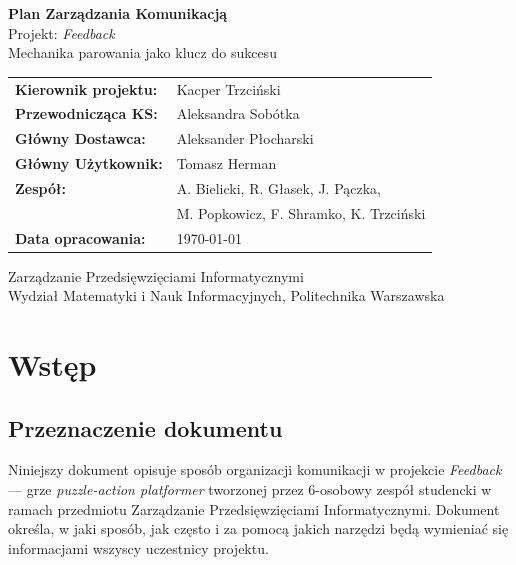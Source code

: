 \documentclass[11pt,a4paper]{article}
\begin{document}
\begin{titlepage}
\centering
\vspace*{2cm}
{\LARGE\bfseries\color{accent} Plan Zarządzania Komunikacją}\\[0.5cm]
{\large Projekt: \textit{Feedback}}\\[0.3cm]
{\normalsize Mechanika parowania jako klucz do sukcesu}\\[2cm]

\begin{tabular}{ll}
\textbf{Kierownik projektu:}   & Kacper Trzciński \\[0.3em]
\textbf{Przewodnicząca KS:}    & Aleksandra Sobótka \\[0.3em]
\textbf{Główny Dostawca:}      & Aleksander Płocharski \\[0.3em]
\textbf{Główny Użytkownik:}    & Tomasz Herman \\[0.3em]
\textbf{Zespół:}               & A. Bielicki, R. Głasek, J. Pączka, \\
                               & M. Popkowicz, F. Shramko, K. Trzciński \\[0.3em]
\textbf{Data opracowania:}     & \today \\[0.3em]
\end{tabular}

\vfill
{\small Zarządzanie Przedsięwzięciami Informatycznymi\\
Wydział Matematyki i Nauk Informacyjnych, Politechnika Warszawska}
\end{titlepage}

\tableofcontents
\newpage

\section{Wstęp}

\subsection{Przeznaczenie dokumentu}
Niniejszy dokument opisuje sposób organizacji komunikacji w projekcie \textit{Feedback} --- 
grze \textit{puzzle-action platformer} tworzonej przez 6-osobowy zespół studencki w ramach przedmiotu Zarządzanie Przedsięwzięciami Informatycznymi. 
Dokument określa, w jaki sposób, jak często i za pomocą jakich narzędzi będą wymieniać się informacjami wszyscy uczestnicy projektu.
\end{document}
